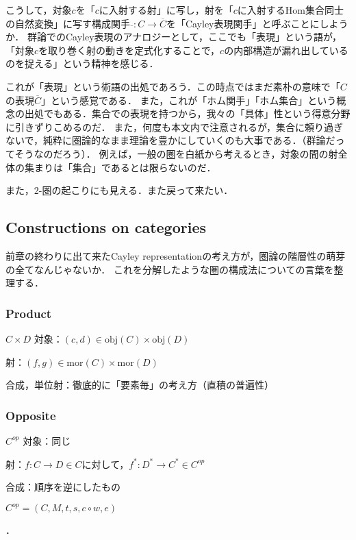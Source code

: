 \documentclass[uplatex, 12pt, dvipdfmx]{jsarticle}
\begin{document}
\begin{remark*}
    こうして，対象$c$を「$c$に入射する射」に写し，射を「$c$に入射するHom集合同士の自然変換」に写す構成関手$\overline{　}:C\to\overline{C}$を「Cayley表現関手」と呼ぶことにしようか．
    群論でのCayley表現のアナロジーとして，ここでも「表現」という語が，「対象$c$を取り巻く射の動きを定式化することで，$c$の内部構造が漏れ出しているのを捉える」という精神を感じる．

    これが「表現」という術語の出処であろう．この時点ではまだ素朴の意味で「$C$の表現$\overline{C}$」という感覚である．
    また，これが「ホム関手」「ホム集合」という概念の出処でもある．集合での表現を持つから，我々の「具体」性という得意分野に引きずりこめるのだ．
    また，何度も本文内で注意されるが，集合に頼り過ぎないで，純粋に圏論的なまま理論を豊かにしていくのも大事である．（群論だってそうなのだろう）．
    例えば，一般の圏を白紙から考えるとき，対象の間の射全体の集まりは「集合」であるとは限らないのだ．

    また，2-圏の起こりにも見える．また戻って来たい．
\end{remark*}

\subsection{Constructions on categories}

前章の終わりに出て来たCayley representationの考え方が，圏論の階層性の萌芽の全てなんじゃないか．
これを分解したような圏の構成法についての言葉を整理する．


\subsubsection{Product}

\begin{itembox}[l]{$C\times D$}
    対象：$(c,d)\in \mathrm{obj}(C)\times \mathrm{obj}(D)$

    射：$(f,g)\in \mathrm{mor}(C)\times\mathrm{mor}(D)$

    合成，単位射：徹底的に「要素毎」の考え方（直積の普遍性）
\end{itembox}

\subsubsection{Opposite}

\begin{itembox}[l]{$C^{op}$}
    対象：同じ

    射：$f:C\to D\in C$に対して，$f^*:D^*\to C^*\in C^{op}$

    合成：順序を逆にしたもの

    $C^{op}=(C,M,t,s,c\circ w,e)$
\end{itembox}．
\end{document}
